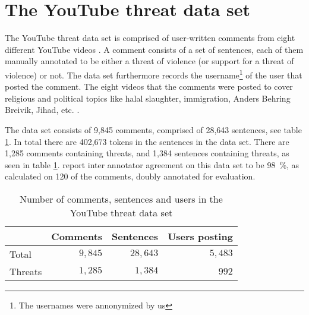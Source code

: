 \documentclass[11pt,letterpaper]{article}
\newcommand{\tov}{threat of violence}
\newcommand{\ds}{the YouTube threat data set}
\begin{document}
\section{The YouTube threat data set}
\label{sec:data}
The YouTube threat data set is comprised of user-written comments from
eight different YouTube videos \cite{hammer2014}. A comment
consists of a set of sentences, each of them manually annotated to be
either a \tov{} (or support for a \tov{}) or not. The data set
furthermore records the username\footnote{The usernames were annonymized by us}
  of the user that posted the
comment. The eight videos that the comments were posted to cover religious and political topics like halal slaughter, immigration,
Anders Behring Breivik, Jihad, etc. \cite{hammer2014}. 

The data set consists of 9,845 comments, comprised of 28,643
sentences, see table \ref{tab:dataset}. In total there are 402,673
tokens in the sentences in the data set. There are 1,285 comments
containing threats, and 1,384 sentences containing threats, as seen in
table \ref{tab:dataset}.   report inter annotator
agreement on this data set to be 98~\%, as calculated on 120 of the
comments, doubly annotated for evaluation.

\begin{table}
\begin{center}
\begin{tabular}{lrrr}
  \toprule
  
  & Comments  & Sentences  & Users posting \\
  \midrule
	
  
  Total  & $9,845$  & $28,643$  & $5,483$  \\
  Threats  & $1,285$  & $1,384$  & $992$  \\
  \bottomrule

\end{tabular}
\end{center}
\caption{Number of comments, sentences and users in \ds{}}
\label{tab:dataset}
\end{table}
\end{document}
